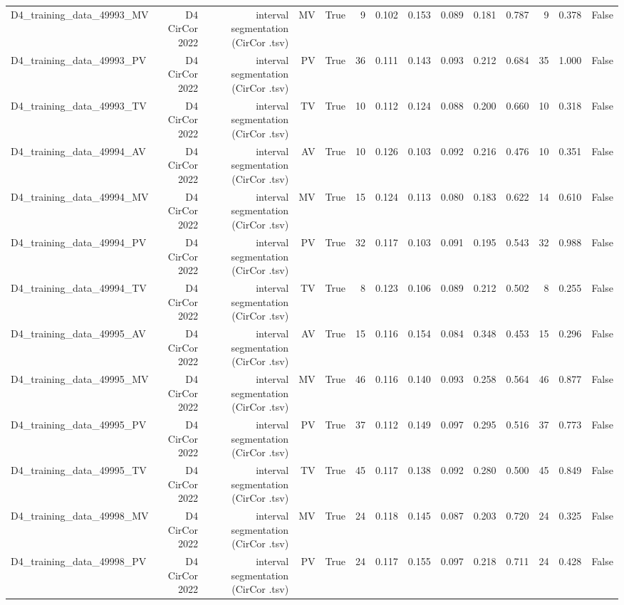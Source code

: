 \begin{table}[htbp]
\begin{tabular}{lrrrrrrrrrrrrr}
    D4\_training\_data\_49993\_MV & D4 CirCor 2022 & interval segmentation (CirCor .tsv) & MV & True & 9 & 0.102 & 0.153 & 0.089 & 0.181 & 0.787 & 9 & 0.378 & False \\
    D4\_training\_data\_49993\_PV & D4 CirCor 2022 & interval segmentation (CirCor .tsv) & PV & True & 36 & 0.111 & 0.143 & 0.093 & 0.212 & 0.684 & 35 & 1.000 & False \\
    D4\_training\_data\_49993\_TV & D4 CirCor 2022 & interval segmentation (CirCor .tsv) & TV & True & 10 & 0.112 & 0.124 & 0.088 & 0.200 & 0.660 & 10 & 0.318 & False \\
    D4\_training\_data\_49994\_AV & D4 CirCor 2022 & interval segmentation (CirCor .tsv) & AV & True & 10 & 0.126 & 0.103 & 0.092 & 0.216 & 0.476 & 10 & 0.351 & False \\
    D4\_training\_data\_49994\_MV & D4 CirCor 2022 & interval segmentation (CirCor .tsv) & MV & True & 15 & 0.124 & 0.113 & 0.080 & 0.183 & 0.622 & 14 & 0.610 & False \\
    D4\_training\_data\_49994\_PV & D4 CirCor 2022 & interval segmentation (CirCor .tsv) & PV & True & 32 & 0.117 & 0.103 & 0.091 & 0.195 & 0.543 & 32 & 0.988 & False \\
    D4\_training\_data\_49994\_TV & D4 CirCor 2022 & interval segmentation (CirCor .tsv) & TV & True & 8 & 0.123 & 0.106 & 0.089 & 0.212 & 0.502 & 8 & 0.255 & False \\
    D4\_training\_data\_49995\_AV & D4 CirCor 2022 & interval segmentation (CirCor .tsv) & AV & True & 15 & 0.116 & 0.154 & 0.084 & 0.348 & 0.453 & 15 & 0.296 & False \\
    D4\_training\_data\_49995\_MV & D4 CirCor 2022 & interval segmentation (CirCor .tsv) & MV & True & 46 & 0.116 & 0.140 & 0.093 & 0.258 & 0.564 & 46 & 0.877 & False \\
    D4\_training\_data\_49995\_PV & D4 CirCor 2022 & interval segmentation (CirCor .tsv) & PV & True & 37 & 0.112 & 0.149 & 0.097 & 0.295 & 0.516 & 37 & 0.773 & False \\
    D4\_training\_data\_49995\_TV & D4 CirCor 2022 & interval segmentation (CirCor .tsv) & TV & True & 45 & 0.117 & 0.138 & 0.092 & 0.280 & 0.500 & 45 & 0.849 & False \\
    D4\_training\_data\_49998\_MV & D4 CirCor 2022 & interval segmentation (CirCor .tsv) & MV & True & 24 & 0.118 & 0.145 & 0.087 & 0.203 & 0.720 & 24 & 0.325 & False \\
    D4\_training\_data\_49998\_PV & D4 CirCor 2022 & interval segmentation (CirCor .tsv) & PV & True & 24 & 0.117 & 0.155 & 0.097 & 0.218 & 0.711 & 24 & 0.428 & False \\

\end{tabular}
\end{table}

